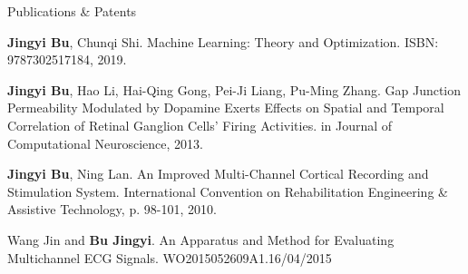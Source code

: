 \documentclass{resume} %
\begin{document}
\begin{rSection}{Publications \& Patents}

\begin{rSubsection}{}{}{}{}
\item \textbf{Jingyi Bu}, Chunqi Shi. Machine Learning: Theory and Optimization. ISBN: 9787302517184, 2019.
\\
\item \textbf{Jingyi Bu}, Hao Li, Hai-Qing Gong, Pei-Ji Liang, Pu-Ming Zhang. Gap Junction Permeability Modulated by Dopamine Exerts Effects on Spatial and Temporal Correlation of Retinal Ganglion Cells' Firing Activities. in Journal of Computational Neuroscience, 2013.
\\
\item \textbf{Jingyi Bu}, Ning Lan. An Improved Multi-Channel Cortical Recording and Stimulation System. International Convention on Rehabilitation Engineering \& Assistive Technology, p. 98-101, 2010.
\\
\item Wang Jin and \textbf{Bu Jingyi}. An Apparatus and Method for Evaluating Multichannel ECG Signals. WO2015052609A1.16/04/2015
\end{rSubsection}

\end{rSection}










\end{document}
